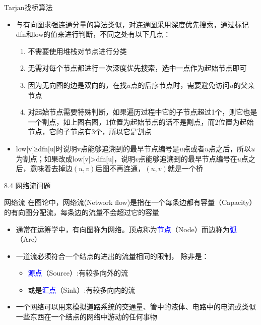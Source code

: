 \begin{frame}{Tarjan找桥算法}
    \begin{itemize}
        \item 与有向图求强连通分量的算法类似，对连通图采用深度优先搜索，通过标记dfn和low的值来进行判断，不同之处有以下几点：
        \begin{enumerate}[(1)]
            \item 不需要使用堆栈对节点进行分类
            \item 无需对每个节点都进行一次深度优先搜索，选中一点作为起始节点即可
            \item 因为无向图的边是双向的，在找$u$点的后序节点时，需要避免访问$u$的父亲节点
            \item 对起始节点需要特殊判断，如果遍历过程中它的子节点超过1个，则它也是一个割点，如上图右图，1位置为起始节点的话不是割点，而2位置为起始节点，它的子节点有3个，所以它是割点
        \end{enumerate}
        \item low[v]≥dfn[u]时说明v点能够追溯到的最早节点编号是$u$点或者$u$点之后，所以$u$为割点；如果改成low[v]>dfn[u]，说明$v$点能够追溯到的最早节点编号在$u$点之后，意味着去掉边$(u,v)$后图不再连通，$(u,v)$就是一个桥
    \end{itemize}
\end{frame}
\begin{frame}{8.4 网络流问题}
    \begin{block}{网络流}
        在图论中，网络流(Network flow)是指在一个每条边都有容量（Capacity）的有向图分配流，每条边的流量不会超过它的容量
    \end{block}
    \vfill
    \begin{itemize}
        \item 通常在运筹学中，有向图称为网络。顶点称为\textcolor{blue}{节点}（Node）而边称为\textcolor{blue}{弧}（Arc）
        \item 一道流必须符合一个结点的进出的流量相同的限制， 除非是：
        \begin{itemize}
            \item \textcolor{blue}{源点}（Source）:有较多向外的流
            \item 或是\textcolor{blue}{汇点}（Sink）:有较多向内的流
        \end{itemize}
        \item 一个网络可以用来模拟道路系统的交通量、管中的液体、电路中的电流或类似一些东西在一个结点的网络中游动的任何事物
    \end{itemize}
\end{frame}
